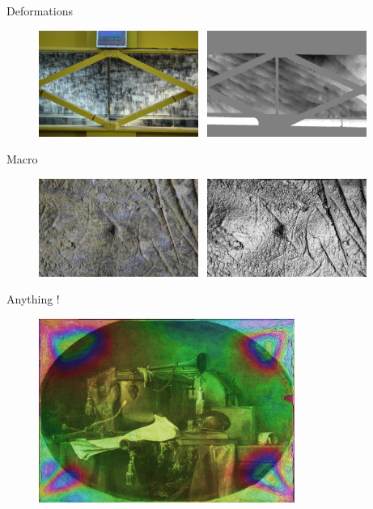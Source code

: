 \documentclass{beamer}
\begin{document}
		\begin{frame}{Deformations}
			 
			\begin{figure}
			  \includegraphics[width=5.2cm]{../MicmacQuickMay2018/images/usage4a} \ 
			  \includegraphics[width=5.2cm]{../MicmacQuickMay2018/images/usage4b}
			\end{figure}
		\end{frame}	
		\begin{frame}{Macro}
			 
			\begin{figure}
			  \includegraphics[width=5.2cm]{../MicmacQuickMay2018/images/usage6a} \ 
			  \includegraphics[width=5.2cm]{../MicmacQuickMay2018/images/usage6b}
			\end{figure}
		\end{frame}	
		\begin{frame}{Anything !}
			 
			\begin{figure}
			  \includegraphics[height=6cm]{../MicmacQuickMay2018/images/usage7}
			\end{figure}

		\end{frame}		      	
\end{document}
